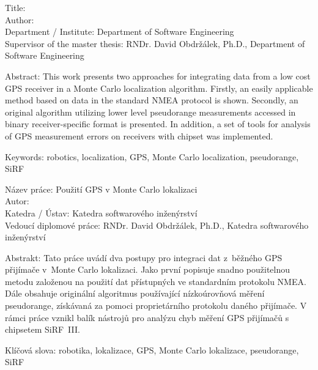 \noindent
Title: \thetitle\\
Author: \theauthor\\
Department / Institute: Department of Software Engineering\\
Supervisor of the master thesis: RNDr. David Obdržálek, Ph.D., Department of Software Engineering

\vspace{5mm}

\noindent
Abstract: This work presents two approaches for integrating data from a low
cost GPS receiver in a Monte Carlo localization algorithm.
Firstly, an easily applicable method based on data in the standard NMEA protocol is shown.
Secondly, an original algorithm utilizing lower level pseudorange measurements accessed in
binary receiver-specific format is presented.
In addition, a set of tools for analysis of GPS measurement errors on receivers
with \sirf chipset was implemented.
\vspace{5mm}

\noindent
Keywords: robotics, localization, GPS, Monte Carlo localization, pseudorange, SiRF

\vspace{25mm}

\noindent
Název práce: Použití GPS v Monte Carlo lokalizaci\\
Autor: \theauthor\\
Katedra / Ústav: Katedra softwarového inženýrství\\
Vedoucí diplomové práce: RNDr. David Obdržálek, Ph.D., Katedra softwarového inženýrství

\vspace{5mm}

\noindent
Abstrakt: Tato práce uvádí dva postupy pro integraci dat z~běžného GPS přijímače
v~Monte Carlo lokalizaci.
Jako první popisuje snadno použitelnou metodu založenou na použití dat přístupných ve standardním
protokolu NMEA.
Dále obsahuje originální algoritmus používající nízkoúrovňová měření pseudorange,
získávaná za pomoci proprietárního protokolu daného přijímače.
V rámci práce vznikl balík nástrojů pro analýzu chyb měření GPS přijímačů
s chipsetem SiRF~III.

\vspace{5mm}

\noindent
Klíčová slova: robotika, lokalizace, GPS, Monte Carlo lokalizace, pseudorange, SiRF

\cleartorecto

